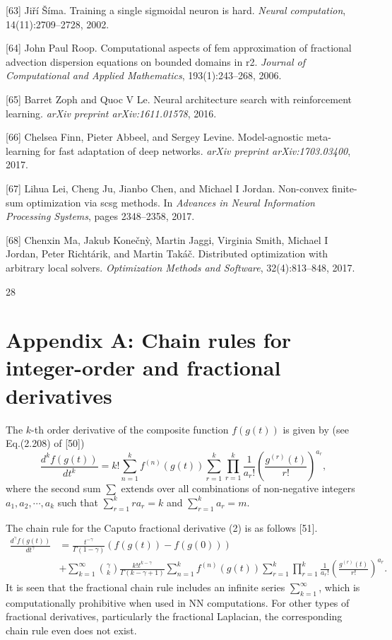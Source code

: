 \documentclass[UTF8]{article}
\begin{document}
[63] Ji\v{r}\'i \v{S}\'ima. Training a single sigmoidal neuron is hard. \textit{Neural computation}, 14(11):2709--2728, 2002.

[64] John Paul Roop. Computational aspects of fem approximation of fractional advection dispersion equations on bounded domains in r2. \textit{Journal of Computational and Applied Mathematics}, 193(1):243--268, 2006.

[65] Barret Zoph and Quoc V Le. Neural architecture search with reinforcement learning. \textit{arXiv preprint arXiv:1611.01578}, 2016.

[66] Chelsea Finn, Pieter Abbeel, and Sergey Levine. Model-agnostic meta-learning for fast adaptation of deep networks. \textit{arXiv preprint arXiv:1703.03400}, 2017.

[67] Lihua Lei, Cheng Ju, Jianbo Chen, and Michael I Jordan. Non-convex finite-sum optimization via scsg methods. In \textit{Advances in Neural Information Processing Systems}, pages 2348--2358, 2017.

[68] Chenxin Ma, Jakub Kone\v{c}n\`y, Martin Jaggi, Virginia Smith, Michael I Jordan, Peter Richt\'arik, and Martin Tak\'a\v{c}. Distributed optimization with arbitrary local solvers. \textit{Optimization Methods and Software}, 32(4):813--848, 2017.

\vfill
28

\section*{Appendix A: Chain rules for integer-order and fractional derivatives}

The $k$-th order derivative of the composite function $f(g(t))$ is given by (see Eq.(2.208) of [50])
\begin{equation}
\frac{d^k f(g(t))}{dt^k} = k! \sum_{n=1}^k f^{(n)}(g(t)) \sum_{r=1}^k \prod_{r=1}^k \frac{1}{a_r!} \left( \frac{g^{(r)}(t)}{r!} \right)^{a_r}, \tag{A.1}
\end{equation}
where the second sum $\sum$ extends over all combinations of non-negative integers $a_1, a_2, \cdots, a_k$ such that $\sum_{r=1}^k r a_r = k$ and $\sum_{r=1}^k a_r = m$.

The chain rule for the Caputo fractional derivative (2) is as follows [51].
\begin{equation}
\begin{aligned}
\frac{d^\gamma f(g(t))}{dt^\gamma} &= \frac{t^{-\gamma}}{\Gamma(1-\gamma)}(f(g(t)) - f(g(0))) \\
&+ \sum_{k=1}^\infty \binom{\gamma}{k} \frac{k! t^{k-\gamma}}{\Gamma(k-\gamma+1)} \sum_{n=1}^k f^{(n)}(g(t)) \sum_{r=1}^k \prod_{r=1}^k \frac{1}{a_r!} \left( \frac{g^{(r)}(t)}{r!} \right)^{a_r}.
\end{aligned} \tag{A.2}
\end{equation}
It is seen that the fractional chain rule includes an infinite series $\sum_{k=1}^\infty$, which is computationally prohibitive when used in NN computations. For other types of fractional derivatives, particularly the fractional Laplacian, the corresponding chain rule even does not exist.
\end{document}
